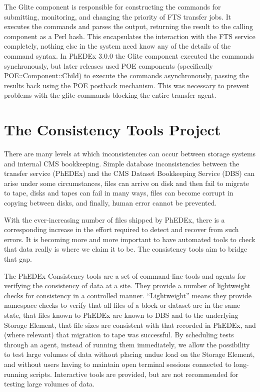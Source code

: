 \documentclass{PoS}
\begin{document}
The Glite component is responsible for constructing the commands for
submitting, monitoring, and changing the priority of FTS
transfer jobs. It executes the commands and parses the output,
returning the result to the calling component as a Perl hash. This
encapsulates the interaction with the FTS service completely, nothing
else in the system need know any of the details of the command
syntax. In PhEDEx 3.0.0 the Glite component executed the commands
synchronously, but later releases used POE components (specifically
POE::Component::Child) to execute the commands asynchronously, passing
the results back using the POE postback mechanism. This was necessary
to prevent problems with the glite commands blocking the entire
transfer agent.

\section{The Consistency Tools Project}

There are many levels at which inconsistencies can occur between
storage systems and internal CMS bookkeeping. Simple database
inconsistencies between the transfer service (PhEDEx) and the CMS
Dataset Bookkeeping Service (DBS) can arise under some circumstances,
files can arrive on disk and then fail to migrate to tape, disks and
tapes can fail in many ways, files can become corrupt in copying
between disks, and finally, human error cannot be prevented.

With the ever-increasing number of files shipped by PhEDEx, there is a
corresponding increase in the effort required to detect and recover
from such errors. It is becoming more and more important to have
automated tools to check that data really is where we claim it to
be. The consistency tools aim to bridge that gap.

The PhEDEx Consistency tools are a set of command-line tools and
agents for verifying the consistency of data at a site. They provide a
number of lightweight checks for consistency in a controlled
manner. ``Lightweight'' means they provide namespace checks to verify
that all files of a block or dataset are in the same state, that files
known to PhEDEx are known to DBS and to the underlying Storage
Element, that file sizes are consistent with that recorded in PhEDEx,
and (where relevant) that migration to tape was successful. By
scheduling tests through an agent, instead of running them
immediately, we allow the possibility to test large volumes of data
without placing undue load on the Storage Element, and without users
having to maintain open terminal sessions connected to long-running
scripts. Interactive tools are provided, but are not recommended for
testing large volumes of data.
\end{document}
